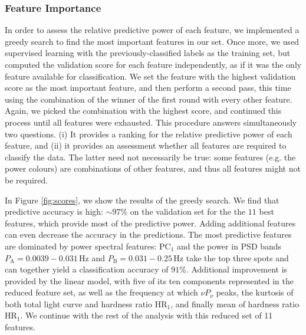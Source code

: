 \documentclass[12pt]{emulateapj}
\begin{document}
\subsubsection{Feature Importance}

In order to assess the relative predictive power of each feature, we implemented a greedy search to find the most important features in our set. 
Once more, we used supervised learning with the previously-classified labels as the training set, but computed the validation score for each feature independently, as if it was the only feature available for classification. We set the feature with the highest validation score as the most important feature, and then perform a second pass, this time using the combination of the winner of the first round with every other feature. Again, we picked the combination with the highest score, and continued this process until all features were exhausted. This procedure answers simultaneously two questions. (i) It provides a ranking for the relative predictive power of each feature, and (ii) it provides an assessment whether all features are required to classify the data. The latter need not necessarily be true: some features (e.g. the power colours) are combinations of other features, and thus all features might not be required.

In Figure \ref{fig:scores}, we show the results of the greedy search. We find that predictive accuracy is high: $\sim\!\! 97\%$ on the validation set for the the $11$ best features, which provide most of the predictive power. Adding additional features can even decrease the accuracy in the predictions. The most predictive features are dominated by power spectral features: $\mathrm{PC}_1$ and the power in PSD bands  $P_\mathrm{A} = 0.0039-0.031 \,\mathrm{Hz}$ and $P_\mathrm{B} = 0.031-0.25 \,\mathrm{Hz}$ take the top three spots and can together yield a classification accuracy of $91\%$. Additional improvement is provided by the linear model, with five of its ten components represented in the reduced feature set, as well as the frequency at which $\nu P_\nu$ peaks, the kurtosis of both total light curve and hardness ratio $\mathrm{HR}_1$, and finally mean of hardness ratio $\mathrm{HR}_1$. We continue with the rest of the analysis with this reduced set of 11 features.

%
%
\end{document}
